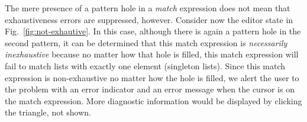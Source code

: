 The mere presence of a pattern hole in a \emph{match} 
expression does not mean that exhaustiveness errors are suppressed, however. Consider now
the editor state in Fig.~\ref{fig:not-exhautive}. In this case,
although there is again a pattern hole in the second pattern, 
it can be determined that this match expression is \emph{necessarily inexhaustive}
because no matter how that hole is filled, this match expression will fail to 
match lists with exactly one element (singleton lists). Since this match expression is non-exhaustive no matter how the hole is filled,
we alert the user to the problem with an error indicator and an error message when the cursor is on the match expression. More diagnostic information would be displayed by clicking the triangle, not shown.

\begin{figure}
  \centering
\end{figure}
